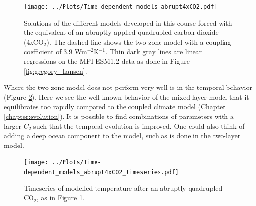 \documentclass[12pt]{book}
\begin{document}
\begin{figure}
\begin{center}
\texttt{[image: ../Plots/Time-dependent\_models\_abrupt4xCO2.pdf]}
\end{center}
\caption{ Solutions of the different models developed in this course forced with the equivalent of an abruptly applied quadrupled carbon dioxide (4xCO$_2$). The dashed line shows the two-zone model with a coupling coefficient of 3.9 Wm$^{-2}$K$^{-1}$. Thin dark gray lines are linear regressions on the MPI-ESM1.2 data as done in Figure \ref{fig:gregory_hansen}. } 
\label{fig:time-dependent_abrupt4xCO2}
\end{figure}

Where the two-zone model does not perform very well is in the temporal behavior (Figure \ref{fig:time-dependent_abrupt4xCO2_timeseries}). Here we see the well-known behavior of the mixed-layer model that it equilibrates too rapidly compared to the coupled climate model (Chapter \ref{chapter:evolution}). It is possible to find combinations of parameters with a larger $C_2$ such that the temporal evolution is improved. One could also think of adding a deep ocean component to the model, such as is done in the two-layer model. 

\begin{figure}
\begin{center}
\texttt{[image: ../Plots/Time-dependent\_models\_abrupt4xCO2\_timeseries.pdf]}
\end{center}
\caption{ Timeseries of modelled temperature after an abruptly quadrupled CO$_2$, as in Figure \ref{fig:time-dependent_abrupt4xCO2}. } 
\label{fig:time-dependent_abrupt4xCO2_timeseries}
\end{figure}
\end{document}
